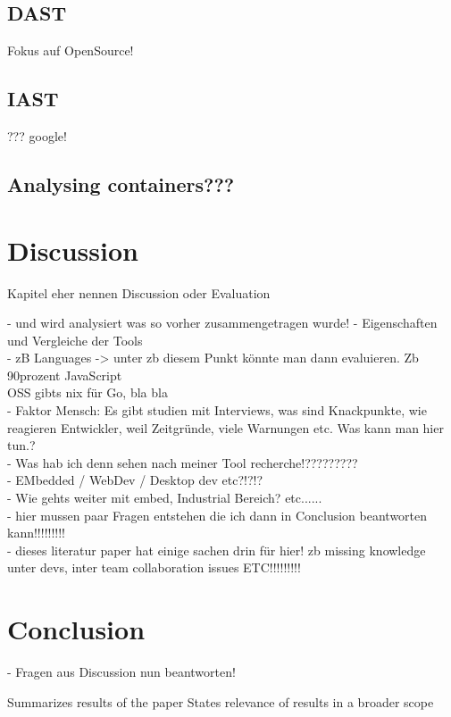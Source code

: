 \documentclass[conference]{IEEEtran}
\begin{document}
\subsection{DAST}
Fokus auf OpenSource!

\subsection{IAST}
??? google!

\subsection{Analysing containers???}


\section{Discussion}


Kapitel eher nennen Discussion oder Evaluation

- und wird analysiert was so vorher zusammengetragen wurde!
- Eigenschaften und Vergleiche der Tools\\
- zB Languages -> unter zb diesem Punkt könnte man dann evaluieren. Zb 90prozent JavaScript\\
OSS gibts nix für Go, bla bla\\
- Faktor Mensch: Es gibt studien mit Interviews, was sind Knackpunkte, wie reagieren Entwickler, weil Zeitgründe, viele Warnungen etc. Was kann man hier tun.?\\
- Was hab ich denn sehen nach meiner Tool recherche!?????????\\
- EMbedded / WebDev / Desktop dev etc?!?!?\\
- Wie gehts weiter mit embed, Industrial Bereich? etc......\\
- hier mussen paar Fragen entstehen die ich dann in Conclusion beantworten kann!!!!!!!!!\\

- dieses literatur paper hat einige sachen drin für hier! zb missing knowledge unter devs, inter team collaboration issues ETC!!!!!!!!!

\section{Conclusion}

- Fragen aus Discussion nun beantworten!

Summarizes results of the paper
 States relevance of results in a broader scope





\end{document}
